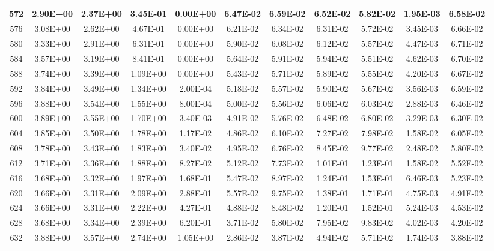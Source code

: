 \begin{landscape}
\begin{longtable}{c||c|c|c|c|c|c|c|c|c|c}
        572 & 2.90E+00 & 2.37E+00 & 3.45E-01 & 0.00E+00 & 6.47E-02 & 6.59E-02 & 6.52E-02 & 5.82E-02 & 1.95E-03 & 6.58E-02 \\ \hline
        576 & 3.08E+00 & 2.62E+00 & 4.67E-01 & 0.00E+00 & 6.21E-02 & 6.34E-02 & 6.31E-02 & 5.72E-02 & 3.45E-03 & 6.66E-02 \\ \hline
        580 & 3.33E+00 & 2.91E+00 & 6.31E-01 & 0.00E+00 & 5.90E-02 & 6.08E-02 & 6.12E-02 & 5.57E-02 & 4.47E-03 & 6.71E-02 \\ \hline
        584 & 3.57E+00 & 3.19E+00 & 8.41E-01 & 0.00E+00 & 5.64E-02 & 5.91E-02 & 5.94E-02 & 5.51E-02 & 4.62E-03 & 6.70E-02 \\ \hline
        588 & 3.74E+00 & 3.39E+00 & 1.09E+00 & 0.00E+00 & 5.43E-02 & 5.71E-02 & 5.89E-02 & 5.55E-02 & 4.20E-03 & 6.67E-02 \\ \hline
        592 & 3.84E+00 & 3.49E+00 & 1.34E+00 & 2.00E-04 & 5.18E-02 & 5.57E-02 & 5.90E-02 & 5.67E-02 & 3.56E-03 & 6.59E-02 \\ \hline
        596 & 3.88E+00 & 3.54E+00 & 1.55E+00 & 8.00E-04 & 5.00E-02 & 5.56E-02 & 6.06E-02 & 6.03E-02 & 2.88E-03 & 6.46E-02 \\ \hline
        600 & 3.89E+00 & 3.55E+00 & 1.70E+00 & 3.40E-03 & 4.91E-02 & 5.76E-02 & 6.48E-02 & 6.80E-02 & 3.29E-03 & 6.30E-02 \\ \hline
        604 & 3.85E+00 & 3.50E+00 & 1.78E+00 & 1.17E-02 & 4.86E-02 & 6.10E-02 & 7.27E-02 & 7.98E-02 & 1.58E-02 & 6.05E-02 \\ \hline
        608 & 3.78E+00 & 3.43E+00 & 1.83E+00 & 3.40E-02 & 4.95E-02 & 6.76E-02 & 8.45E-02 & 9.77E-02 & 2.48E-02 & 5.80E-02 \\ \hline
        612 & 3.71E+00 & 3.36E+00 & 1.88E+00 & 8.27E-02 & 5.12E-02 & 7.73E-02 & 1.01E-01 & 1.23E-01 & 1.58E-02 & 5.52E-02 \\ \hline
        616 & 3.68E+00 & 3.32E+00 & 1.97E+00 & 1.68E-01 & 5.47E-02 & 8.97E-02 & 1.24E-01 & 1.53E-01 & 6.46E-03 & 5.23E-02 \\ \hline
        620 & 3.66E+00 & 3.31E+00 & 2.09E+00 & 2.88E-01 & 5.57E-02 & 9.75E-02 & 1.38E-01 & 1.71E-01 & 4.75E-03 & 4.91E-02 \\ \hline
        624 & 3.66E+00 & 3.31E+00 & 2.22E+00 & 4.27E-01 & 4.88E-02 & 8.48E-02 & 1.20E-01 & 1.52E-01 & 5.24E-03 & 4.53E-02 \\ \hline
        628 & 3.68E+00 & 3.34E+00 & 2.39E+00 & 6.20E-01 & 3.71E-02 & 5.80E-02 & 7.95E-02 & 9.83E-02 & 4.02E-03 & 4.20E-02 \\ \hline
        632 & 3.88E+00 & 3.57E+00 & 2.74E+00 & 1.05E+00 & 2.86E-02 & 3.87E-02 & 4.94E-02 & 5.71E-02 & 1.74E-03 & 3.88E-02 \\ \hline

\end{longtable}
\end{landscape}
